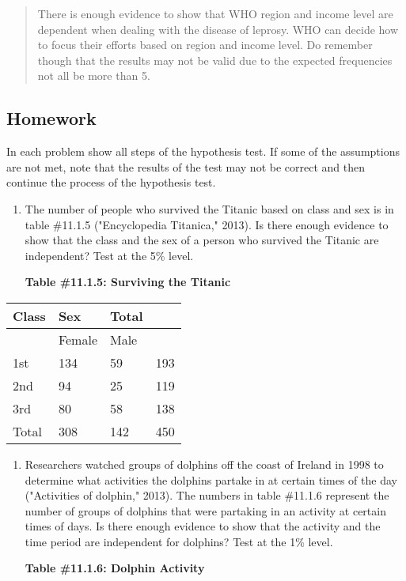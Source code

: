 \documentclass[]{book}
\begin{document}
\begin{quote}
There is enough evidence to show that WHO region and income level are dependent when dealing with the disease of leprosy. WHO can decide how to focus their efforts based on region and income level. Do remember though that the results may not be valid due to the expected frequencies not all be more than 5.
\end{quote}

\hypertarget{homework-32}{%
\subsection{Homework}\label{homework-32}}

In each problem show all steps of the hypothesis test. If some of the assumptions are not met, note that the results of the test may not be correct and then continue the process of the hypothesis test.

\begin{enumerate}
\def\labelenumi{\arabic{enumi}.}
\item
  The number of people who survived the Titanic based on class and sex is in table \#11.1.5 ("Encyclopedia Titanica," 2013). Is there enough evidence to show that the class and the sex of a person who survived the Titanic are independent? Test at the 5\% level.

  \textbf{Table \#11.1.5: Surviving the Titanic}
\end{enumerate}

\begin{longtable}[]{@{}llll@{}}
\toprule
Class & Sex & Total &\tabularnewline
\midrule
\endhead
& Female & Male &\tabularnewline
1st & 134 & 59 & 193\tabularnewline
2nd & 94 & 25 & 119\tabularnewline
3rd & 80 & 58 & 138\tabularnewline
Total & 308 & 142 & 450\tabularnewline
\bottomrule
\end{longtable}

\begin{enumerate}
\def\labelenumi{\arabic{enumi}.}
\setcounter{enumi}{1}
\item
  Researchers watched groups of dolphins off the coast of Ireland in 1998 to determine what activities the dolphins partake in at certain times of the day ("Activities of dolphin," 2013). The numbers in table \#11.1.6 represent the number of groups of dolphins that were partaking in an activity at certain times of days. Is there enough evidence to show that the activity and the time period are independent for dolphins? Test at the 1\% level.

  \textbf{Table \#11.1.6: Dolphin Activity}
\end{enumerate}
\end{document}
